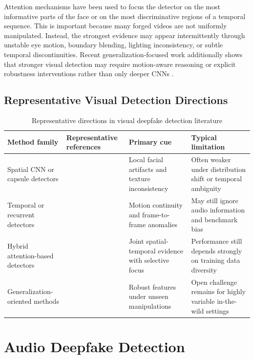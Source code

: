 Attention mechanisms have been used to focus the detector on the most informative parts of the face or on the most discriminative regions of a temporal sequence. This is important because many forged videos are not uniformly manipulated. Instead, the strongest evidence may appear intermittently through unstable eye motion, boundary blending, lighting inconsistency, or subtle temporal discontinuities. Recent generalization-focused work additionally shows that stronger visual detection may require motion-aware reasoning or explicit robustness interventions rather than only deeper CNNs \cite{lewis2020deepfake,fu2025unbiased,prashnani2024phase,xu2025vod}.

\subsection{Representative Visual Detection Directions}

\begin{table}[H]
\centering
\small
\caption{Representative directions in visual deepfake detection literature}
\label{tab:visual-literature}
\begin{tabular}{p{}p{}p{}p{}}
\toprule
\textbf{Method family} & \textbf{Representative references} & \textbf{Primary cue} & \textbf{Typical limitation} \\
\midrule
Spatial CNN or capsule detectors & \cite{nguyen2019capsule,afchar2018mesonet} & Local facial artifacts and texture inconsistency & Often weaker under distribution shift or temporal ambiguity \\
Temporal or recurrent detectors & \cite{guera2018deepfake,zhou2017two} & Motion continuity and frame-to-frame anomalies & May still ignore audio information and benchmark bias \\
Hybrid attention-based detectors & \cite{lewis2020deepfake,huang2024spatiotemporal,antad2024hybrid} & Joint spatial-temporal evidence with selective focus & Performance still depends strongly on training data diversity \\
Generalization-oriented methods & \cite{fu2025unbiased,prashnani2024phase,xu2025vod} & Robust features under unseen manipulations & Open challenge remains for highly variable in-the-wild settings \\
\bottomrule
\end{tabular}
\end{table}

\section{Audio Deepfake Detection}

